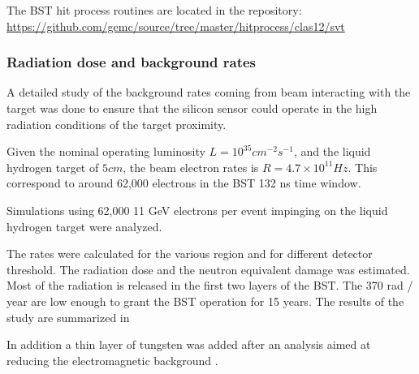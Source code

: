 The BST hit process routines are located in the repository: \url{https://github.com/gemc/source/tree/master/hitprocess/clas12/svt}

\subsubsection{Radiation dose and background rates}
A detailed study of the background rates coming from beam interacting with the target was done to ensure that the silicon sensor
could operate in the high radiation conditions of the target proximity.

Given the nominal operating luminosity $L=10^{35} cm^{-2}s^{-1}$, and the liquid hydrogen target of $5 cm$, the beam electron rates
is $R=4.7 \times 10^{11} Hz$. This correspond to around 62,000 electrons in the BST 132 ns time window.

Simulations using 62,000 11 GeV electrons per event impinging on the liquid hydrogen target were analyzed.


The rates were calculated for the various region and for different detector threshold.
The radiation dose and the neutron equivalent damage was estimated. Most of the radiation
is released in the first two layers of the BST.
The 370 rad / year are low enough to grant the BST operation for 15 years. The results of the study
are summarized in 

In addition a thin layer of tungsten was added after an analysis aimed at reducing the electromagnetic
background \cite{bstDose}.

